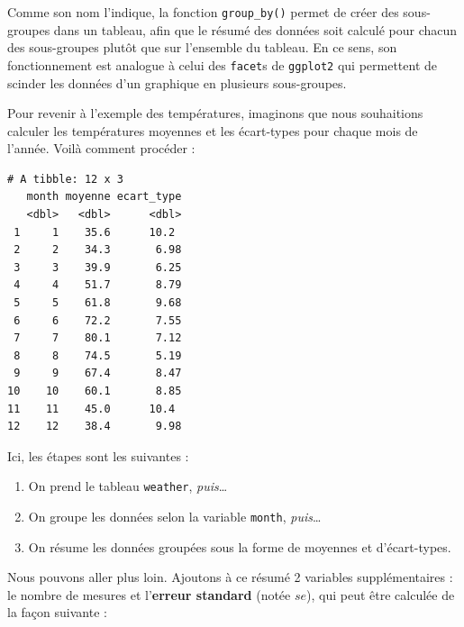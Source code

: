 \documentclass[a4paperpaper,]{article}
\newenvironment{Shaded}{\begin{snugshade}}{\end{snugshade}}
\newcommand{\DataTypeTok}[1]{\textcolor[rgb]{0.00,0.34,0.68}{#1}}
\newcommand{\KeywordTok}[1]{\textcolor[rgb]{0.12,0.11,0.11}{\textbf{#1}}}
\newcommand{\NormalTok}[1]{\textcolor[rgb]{0.12,0.11,0.11}{#1}}
\newcommand{\OperatorTok}[1]{\textcolor[rgb]{0.12,0.11,0.11}{#1}}
\newcommand{\OtherTok}[1]{\textcolor[rgb]{0.00,0.43,0.16}{#1}}
\newcommand{\StringTok}[1]{\textcolor[rgb]{0.75,0.01,0.01}{#1}}
\providecommand{\tightlist}{%
  \setlength{\itemsep}{0pt}\setlength{\parskip}{0pt}}
\begin{document}
Comme son nom l'indique, la fonction \texttt{group\_by()} permet de créer des sous-groupes dans un tableau, afin que le résumé des données soit calculé pour chacun des sous-groupes plutôt que sur l'ensemble du tableau. En ce sens, son fonctionnement est analogue à celui des \texttt{facet}s de \texttt{ggplot2} qui permettent de scinder les données d'un graphique en plusieurs sous-groupes.

Pour revenir à l'exemple des températures, imaginons que nous souhaitions calculer les températures moyennes et les écart-types pour chaque mois de l'année. Voilà comment procéder :

\begin{Shaded}
\end{Shaded}

\begin{verbatim}
# A tibble: 12 x 3
   month moyenne ecart_type
   <dbl>   <dbl>      <dbl>
 1     1    35.6      10.2 
 2     2    34.3       6.98
 3     3    39.9       6.25
 4     4    51.7       8.79
 5     5    61.8       9.68
 6     6    72.2       7.55
 7     7    80.1       7.12
 8     8    74.5       5.19
 9     9    67.4       8.47
10    10    60.1       8.85
11    11    45.0      10.4 
12    12    38.4       9.98
\end{verbatim}

Ici, les étapes sont les suivantes :

\begin{enumerate}
\def\labelenumi{\arabic{enumi}.}
\tightlist
\item
  On prend le tableau \texttt{weather}, \emph{puis}\ldots{}
\item
  On groupe les données selon la variable \texttt{month}, \emph{puis}\ldots{}
\item
  On résume les données groupées sous la forme de moyennes et d'écart-types.
\end{enumerate}

Nous pouvons aller plus loin. Ajoutons à ce résumé 2 variables supplémentaires : le nombre de mesures et l'\textbf{erreur standard} (notée \(se\)), qui peut être calculée de la façon suivante :
\end{document}

